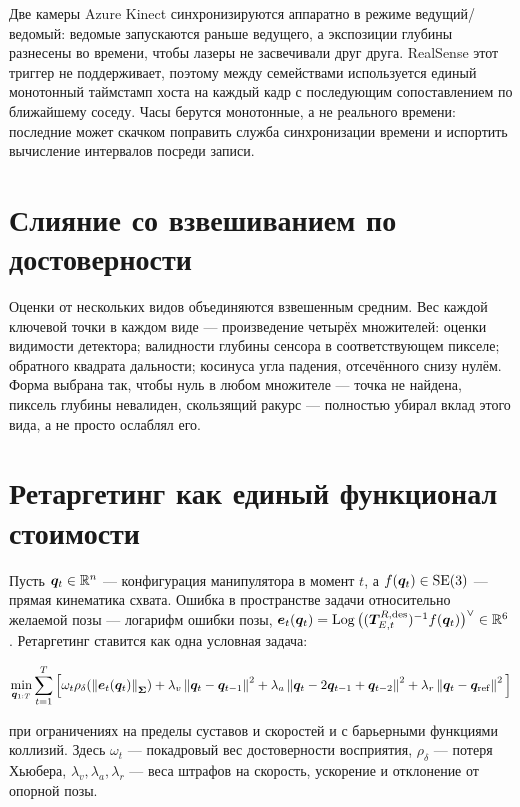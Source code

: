 \documentclass[12pt, a4paper, oneside]{report}
\begin{document}
Две камеры Azure Kinect синхронизируются аппаратно в режиме ведущий/ведомый:
ведомые запускаются раньше ведущего, а экспозиции глубины разнесены во времени,
чтобы лазеры не засвечивали друг друга. RealSense этот триггер не поддерживает,
поэтому между семействами используется единый монотонный таймстамп хоста на каждый
кадр с последующим сопоставлением по ближайшему соседу. Часы берутся монотонные, а
не реального времени: последние может скачком поправить служба синхронизации
времени и испортить вычисление интервалов посреди записи.

\section{Слияние со взвешиванием по достоверности}

Оценки от нескольких видов объединяются взвешенным средним. Вес каждой ключевой
точки в каждом виде --- произведение четырёх множителей: оценки видимости
детектора; валидности глубины сенсора в соответствующем пикселе; обратного
квадрата дальности; косинуса угла падения, отсечённого снизу нулём. Форма выбрана
так, чтобы нуль в любом множителе --- точка не найдена, пиксель глубины невалиден,
скользящий ракурс --- полностью убирал вклад этого вида, а не просто ослаблял его.

\section{Ретаргетинг как единый функционал стоимости}

Пусть $\bm{q}_t \in \mathbb{R}^{n}$ --- конфигурация манипулятора в момент $t$, а
$f(\bm{q}_t) \in \mathrm{SE}(3)$ --- прямая кинематика схвата. Ошибка в пространстве задачи
относительно желаемой позы --- логарифм ошибки позы,
$\bm{e}_t(\bm{q}_t) = \operatorname{Log}\big((\bm{T}^{R,\mathrm{des}}_{E,t})^{-1} f(\bm{q}_t)\big)^{\vee}
\in \mathbb{R}^{6}$. Ретаргетинг ставится как одна условная задача:

\begin{equation}
  \min_{\bm{q}_{1:T}} \sum_{t=1}^{T} \Big[
    \omega_t \rho_\delta\!\left(\left\lVert \bm{e}_t(\bm{q}_t) \right\rVert_{\bm{\Sigma}}\right)
    + \lambda_v \left\lVert \bm{q}_t - \bm{q}_{t-1} \right\rVert^{2}
    + \lambda_a \left\lVert \bm{q}_t - 2\bm{q}_{t-1} + \bm{q}_{t-2} \right\rVert^{2}
    + \lambda_r \left\lVert \bm{q}_t - \bm{q}_{\mathrm{ref}} \right\rVert^{2}
  \Big]
\end{equation}

при ограничениях на пределы суставов и скоростей и с барьерными функциями
коллизий. Здесь $\omega_t$ --- покадровый вес достоверности восприятия,
$\rho_\delta$ --- потеря Хьюбера, $\lambda_v, \lambda_a, \lambda_r$ --- веса
штрафов на скорость, ускорение и отклонение от опорной позы.
\end{document}
